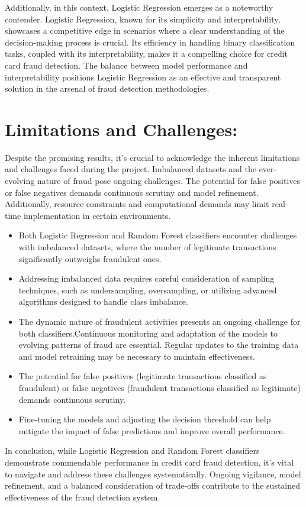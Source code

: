 Additionally, in this context, Logistic Regression emerges as a noteworthy contender. Logistic Regression, known for its simplicity and interpretability, showcases a competitive edge in scenarios where a clear understanding of the decision-making process is crucial. Its efficiency in handling binary classification tasks, coupled with its interpretability, makes it a compelling choice for credit card fraud detection. The balance between model performance and interpretability positions Logistic Regression as an effective and transparent solution in the arsenal of fraud detection methodologies.









\section{Limitations and Challenges:}
Despite the promising results, it's crucial to acknowledge the inherent limitations and challenges faced during the project. Imbalanced datasets and the ever-evolving nature of fraud pose ongoing challenges. The potential for false positives or false negatives demands continuous scrutiny and model refinement. Additionally, resource constraints and computational demands may limit real-time implementation in certain environments.
\begin{itemize}
\item Both Logistic Regression and Random Forest classifiers encounter challenges with imbalanced datasets, where the number of legitimate transactions significantly outweighs fraudulent ones.
\item Addressing imbalanced data requires careful consideration of sampling techniques, such as undersampling, oversampling, or utilizing advanced algorithms designed to handle class imbalance.
\item The dynamic nature of fraudulent activities presents an ongoing challenge for both classifiers.Continuous monitoring and adaptation of the models to evolving patterns of fraud are essential. Regular updates to the training data and model retraining may be necessary to maintain effectiveness.
\item The potential for false positives (legitimate transactions classified as fraudulent) or false negatives (fraudulent transactions classified as legitimate) demands continuous scrutiny.
\item Fine-tuning the models and adjusting the decision threshold can help mitigate the impact of false predictions and improve overall performance.\medskip

\end{itemize}
In conclusion, while Logistic Regression and Random Forest classifiers demonstrate commendable performance in credit card fraud detection, it's vital to navigate and address these challenges systematically. Ongoing vigilance, model refinement, and a balanced consideration of trade-offs contribute to the sustained effectiveness of the fraud detection system.

